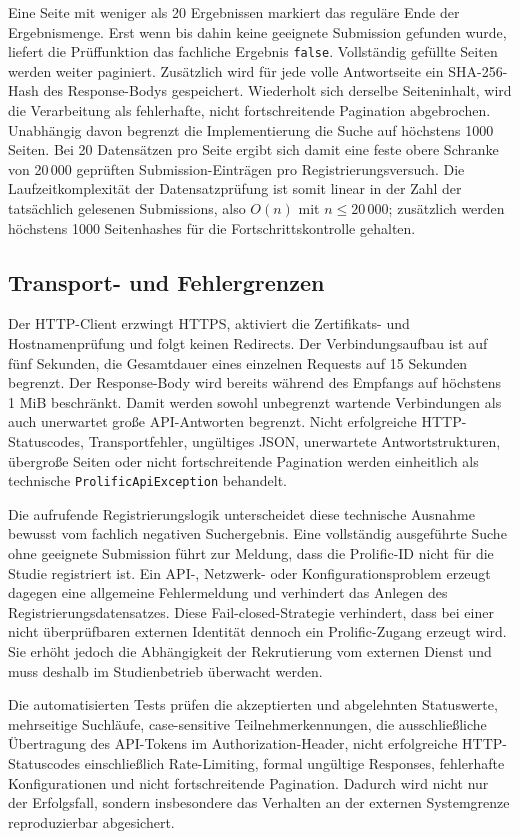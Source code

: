 \begin{neu}
Eine Seite mit weniger als 20 Ergebnissen markiert das reguläre Ende der Ergebnismenge. Erst wenn bis dahin keine geeignete Submission gefunden wurde, liefert die Prüffunktion das fachliche Ergebnis \texttt{false}. Vollständig gefüllte Seiten werden weiter paginiert. Zusätzlich wird für jede volle Antwortseite ein SHA-256-Hash des Response-Bodys gespeichert. Wiederholt sich derselbe Seiteninhalt, wird die Verarbeitung als fehlerhafte, nicht fortschreitende Pagination abgebrochen. Unabhängig davon begrenzt die Implementierung die Suche auf höchstens 1000 Seiten. Bei 20 Datensätzen pro Seite ergibt sich damit eine feste obere Schranke von 20\,000 geprüften Submission-Einträgen pro Registrierungsversuch. Die Laufzeitkomplexität der Datensatzprüfung ist somit linear in der Zahl der tatsächlich gelesenen Submissions, also \(O(n)\) mit \(n \leq 20\,000\); zusätzlich werden höchstens 1000 Seitenhashes für die Fortschrittskontrolle gehalten.

\subsection{Transport- und Fehlergrenzen}

Der HTTP-Client erzwingt HTTPS, aktiviert die Zertifikats- und Hostnamenprüfung und folgt keinen Redirects. Der Verbindungsaufbau ist auf fünf Sekunden, die Gesamtdauer eines einzelnen Requests auf 15 Sekunden begrenzt. Der Response-Body wird bereits während des Empfangs auf höchstens 1 MiB beschränkt. Damit werden sowohl unbegrenzt wartende Verbindungen als auch unerwartet große API-Antworten begrenzt. Nicht erfolgreiche HTTP-Statuscodes, Transportfehler, ungültiges JSON, unerwartete Antwortstrukturen, übergroße Seiten oder nicht fortschreitende Pagination werden einheitlich als technische \texttt{ProlificApiException} behandelt.

Die aufrufende Registrierungslogik unterscheidet diese technische Ausnahme bewusst vom fachlich negativen Suchergebnis. Eine vollständig ausgeführte Suche ohne geeignete Submission führt zur Meldung, dass die Prolific-ID nicht für die Studie registriert ist. Ein API-, Netzwerk- oder Konfigurationsproblem erzeugt dagegen eine allgemeine Fehlermeldung und verhindert das Anlegen des Registrierungsdatensatzes. Diese Fail-closed-Strategie verhindert, dass bei einer nicht überprüfbaren externen Identität dennoch ein Prolific-Zugang erzeugt wird. Sie erhöht jedoch die Abhängigkeit der Rekrutierung vom externen Dienst und muss deshalb im Studienbetrieb überwacht werden.

Die automatisierten Tests prüfen die akzeptierten und abgelehnten Statuswerte, mehrseitige Suchläufe, case-sensitive Teilnehmerkennungen, die ausschließliche Übertragung des API-Tokens im Authorization-Header, nicht erfolgreiche HTTP-Statuscodes einschließlich Rate-Limiting, formal ungültige Responses, fehlerhafte Konfigurationen und nicht fortschreitende Pagination. Dadurch wird nicht nur der Erfolgsfall, sondern insbesondere das Verhalten an der externen Systemgrenze reproduzierbar abgesichert.
\end{neu}
